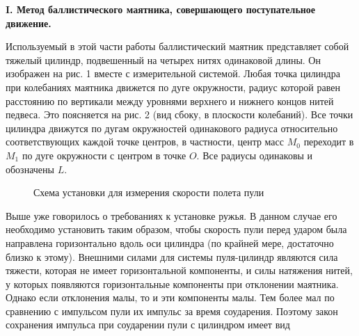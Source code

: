 \documentclass[14pt]{article}
\begin{document}
\vspace{0.5cm}
\textbf{I. Метод баллистического маятника, совершающего поступательное движение.}

Используемый в этой части работы баллистический маятник представляет собой тяжелый цилиндр, подвешенный на четырех нитях одинаковой длины. Он изображен на рис. 1 вместе с измерительной системой. Любая точка цилиндра при колебаниях маятника движется по дуге окружности, радиус которой равен расстоянию по вертикали между уровнями верхнего и нижнего концов нитей педвеса. Это поясняется на рис. 2 (вид сбоку, в плоскости колебаний). Все точки цилиндра движутся по дугам окружностей одинакового радиуса относительно соответствующих каждой точке центров, в частности, центр масс $M_0$ переходит в $M_1$ по дуге окружности с центром в точке $O$. Все радиусы одинаковы и обозначены $L$.

\begin{figure}[h!]
	\caption{Схема установки для измерения скорости полета пули}
\end{figure} 

Выше уже говорилось о требованиях к установке ружья. В данном случае его необходимо установить таким образом, чтобы скорость пули перед ударом была направлена горизонтально вдоль оси цилиндра (по крайней мере, достаточно близко к этому). Внешними силами для системы пуля-цилиндр являются сила тяжести, которая не имеет горизонтальной компоненты, и силы натяжения нитей, у которых появляются горизонтальные компоненты при отклонении маятника. Однако если отклонения малы, то и эти компоненты малы. Тем более мал по сравнению с импульсом пули их импульс за время соударения. Поэтому закон сохранения импульса при соударении пули с цилиндром имеет вид
\end{document}
